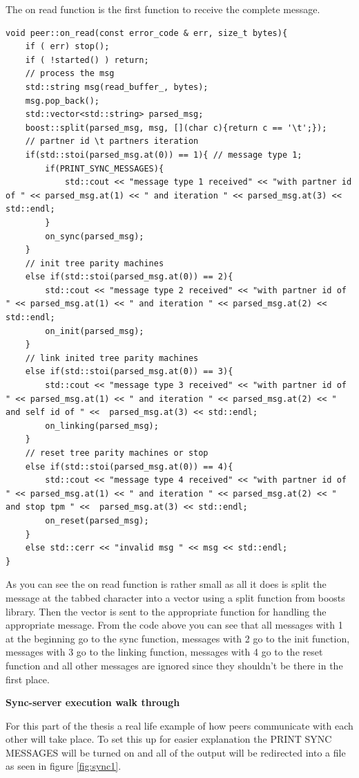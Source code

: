 The on read function is the first function to receive the complete message. 
\begin{lstlisting}
void peer::on_read(const error_code & err, size_t bytes){
	if ( err) stop();
	if ( !started() ) return;
	// process the msg
	std::string msg(read_buffer_, bytes);
	msg.pop_back();
	std::vector<std::string> parsed_msg; 
	boost::split(parsed_msg, msg, [](char c){return c == '\t';});
	// partner id \t partners iteration
	if(std::stoi(parsed_msg.at(0)) == 1){ // message type 1;
		if(PRINT_SYNC_MESSAGES){
			std::cout << "message type 1 received" << "with partner id of " << parsed_msg.at(1) << " and iteration " << parsed_msg.at(3) <<  std::endl;
		}
		on_sync(parsed_msg);
	} 
	// init tree parity machines
	else if(std::stoi(parsed_msg.at(0)) == 2){
		std::cout << "message type 2 received" << "with partner id of " << parsed_msg.at(1) << " and iteration " << parsed_msg.at(2) <<  std::endl;
		on_init(parsed_msg);
	}
	// link inited tree parity machines
	else if(std::stoi(parsed_msg.at(0)) == 3){
		std::cout << "message type 3 received" << "with partner id of " << parsed_msg.at(1) << " and iteration " << parsed_msg.at(2) << " and self id of " <<  parsed_msg.at(3) << std::endl;
		on_linking(parsed_msg);
	}
	// reset tree parity machines or stop
	else if(std::stoi(parsed_msg.at(0)) == 4){
		std::cout << "message type 4 received" << "with partner id of " << parsed_msg.at(1) << " and iteration " << parsed_msg.at(2) << " and stop tpm " <<  parsed_msg.at(3) << std::endl;
		on_reset(parsed_msg);
	}
	else std::cerr << "invalid msg " << msg << std::endl;
}
\end{lstlisting}
As you can see the on read function is rather small as all it does is split the message at the tabbed character into a vector using a split function from boosts library. 
Then the vector is sent to the appropriate function for handling the appropriate message. 
From the code above you can see that all messages with 1 at the beginning go to the sync function, messages with 2 go to the init function, messages with 3 go to the linking function, messages with 4 go to the reset function and all other messages are ignored since they shouldn't be there in the first place.

\textbf{Sync-server execution walk through}

For this part of the thesis a real life example of how peers communicate with each other will take place.
To set this up for easier explanation the PRINT SYNC MESSAGES will be turned on and all of the output will be redirected into a file as seen in figure \ref{fig:sync1}.

